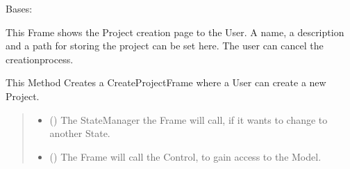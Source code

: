 \documentclass[letterpaper,10pt,english]{sphinxmanual}
\begin{document}
\begin{fulllineitems}
\label{\detokenize{apidoc/src.osm_configurator.view.toplevelframes:src.osm_configurator.view.toplevelframes.create_project_frame.CreateProjectFrame}}
\pysigstartsignatures
{}
\pysigstopsignatures
\sphinxAtStartPar
Bases: {\hyperref[\detokenize{apidoc/src.osm_configurator.view.toplevelframes:src.osm_configurator.view.toplevelframes.top_level_frame.TopLevelFrame}]{}}

\sphinxAtStartPar
This Frame shows the Project creation page to the User.
A name, a description and a path for storing the project can be set here.
The user can cancel the creation\sphinxhyphen{}process.

\begin{fulllineitems}
\label{\detokenize{apidoc/src.osm_configurator.view.toplevelframes:src.osm_configurator.view.toplevelframes.create_project_frame.CreateProjectFrame.__init__}}
\pysigstartsignatures
{}
\pysigstopsignatures
\sphinxAtStartPar
This Method Creates a CreateProjectFrame where a User can create a new Project.
\begin{quote}\begin{description}
\begin{itemize}
\item {} 
\sphinxAtStartPar
{} ({\hyperref[\detokenize{apidoc/src.osm_configurator.view.states:src.osm_configurator.view.states.state_manager.StateManager}]{}}) \textendash{} The StateManager the Frame will call, if it wants to change to another State.

\item {} 
\sphinxAtStartPar
{} ({\hyperref[\detokenize{apidoc/src.osm_configurator.control:src.osm_configurator.control.control_interface.IControl}]{}}) \textendash{} The Frame will call the Control, to gain access to the Model.

\end{itemize}

\end{description}\end{quote}

\end{fulllineitems}


\end{fulllineitems}
\end{document}
